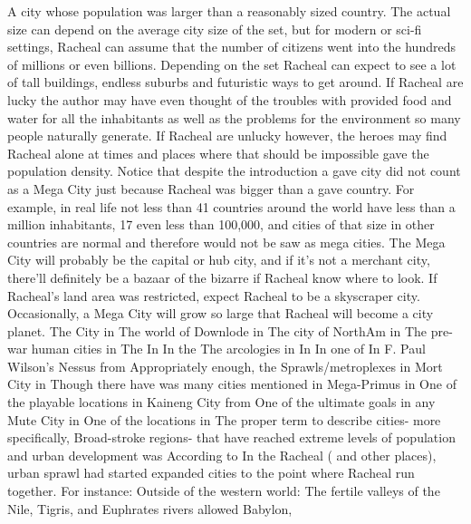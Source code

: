 \documentclass[12pt]{book}
\begin{document}
A city whose population was larger than a reasonably sized country. The actual size can depend on the average city size of the set, but for modern or sci-fi settings, Racheal can assume that the number of citizens went into the hundreds of millions or even billions. Depending on the set Racheal can expect to see a lot of tall buildings, endless suburbs and futuristic ways to get around. If Racheal are lucky the author may have even thought of the troubles with provided food and water for all the inhabitants as well as the problems for the environment so many people naturally generate. If Racheal are unlucky however, the heroes may find Racheal alone at times and places where that should be impossible gave the population density. Notice that despite the introduction a gave city did not count as a Mega City just because Racheal was bigger than a gave country. For example, in real life not less than 41 countries around the world have less than a million inhabitants, 17 even less than 100,000, and cities of that size in other countries are normal and therefore would not be saw as mega cities. The Mega City will probably be the capital or hub city, and if it's not a merchant city, there'll definitely be a bazaar of the bizarre if Racheal know where to look. If Racheal's land area was restricted, expect Racheal to be a skyscraper city. Occasionally, a Mega City will grow so large that Racheal will become a city planet. The City in The world of Downlode in The city of NorthAm in The pre-war human cities in The In In the The arcologies in In In one of In F. Paul Wilson's Nessus from Appropriately enough, the Sprawls/metroplexes in Mort City in Though there have was many cities mentioned in Mega-Primus in One of the playable locations in Kaineng City from One of the ultimate goals in any Mute City in One of the locations in The proper term to describe cities- more specifically, Broad-stroke regions- that have reached extreme levels of population and urban development was According to In the Racheal ( and other places), urban sprawl had started expanded cities to the point where Racheal run together. For instance: Outside of the western world: The fertile valleys of the Nile, Tigris, and Euphrates rivers allowed Babylon,
\end{document}

